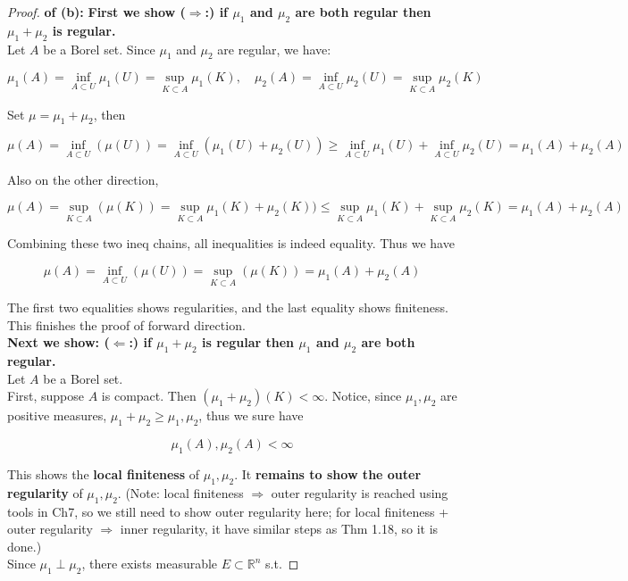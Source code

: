 \begin{proof}

\textbf{of (b):} \textbf{First we show (\(\Longrightarrow\):) if \(\mu_{1}\) and \(\mu_{2}\) are both regular then \(\mu_{1} + \mu_{2}\) is regular.}\\
Let \(A\) be a Borel set. Since \(\mu_{1}\) and \(\mu_{2}\) are regular, we have:

\[\mu_{1}(A) = \inf\limits_{A \subset U}\mu_{1}(U) = \sup\limits_{K \subset A}\mu_{1}(K),\quad\mu_{2}(A) = \inf\limits_{A \subset U}\mu_{2}(U) = \sup\limits_{K \subset A}\mu_{2}(K)\]

Set \(\mu = \mu_{1} + \mu_{2}\), then

\[\mu(A) = \inf\limits_{A \subset U}(\mu(U)) = \inf\limits_{A \subset U}(\mu_{1}(U) + \mu_{2}(U)) \geq \inf\limits_{A \subset U}\mu_{1}(U) + \inf\limits_{A \subset U}\mu_{2}(U) = \mu_{1}(A) + \mu_{2}(A)\]

Also on the other direction,

\[\mu(A) = \sup\limits_{K \subset A}(\mu(K)) = \sup\limits_{K \subset A}\mu_{1}(K) + \mu_{2}(K)) \leq \sup\limits_{K \subset A}\mu_{1}(K) + \sup\limits_{K \subset A}\mu_{2}(K) = \mu_{1}(A) + \mu_{2}(A)\]

Combining these two ineq chains, all inequalities is indeed equality. Thus we have

\[\mu(A) = \inf\limits_{A \subset U}(\mu(U)) = \sup\limits_{K \subset A}(\mu(K)) = \mu_{1}(A) + \mu_{2}(A)\]

The first two equalities shows regularities, and the last equality shows finiteness. This finishes the proof of forward direction.\\
\textbf{Next we show: (\(\Longleftarrow\):) if \(\mu_{1} + \mu_{2}\) is regular then \(\mu_{1}\) and \(\mu_{2}\) are both regular.}\\
Let \(A\) be a Borel set.\\
First, suppose \(A\) is compact. Then \((\mu_{1} + \mu_{2})(K) < \infty\). Notice, since \(\mu_{1},\mu_{2}\) are positive measures, \(\mu_{1} + \mu_{2} \geq \mu_{1},\mu_{2}\), thus we sure have

\[\mu_{1}(A),\mu_{2}(A) < \infty\]

This shows the \textbf{local finiteness} of \(\mu_{1},\mu_{2}\). It \textbf{remains to show the outer regularity} of \(\mu_{1},\mu_{2}\). (Note: local finiteness \(\Longrightarrow\) outer regularity is reached using tools in Ch7, so we still need to show outer regularity here; for local finiteness + outer regularity \(\Longrightarrow\) inner regularity, it have similar steps as Thm 1.18, so it is done.)\\
Since \(\mu_{1} \perp \mu_{2}\), there exists measurable \(E \subset \mathbb{R}^{n}\) s.t.


\end{proof}
